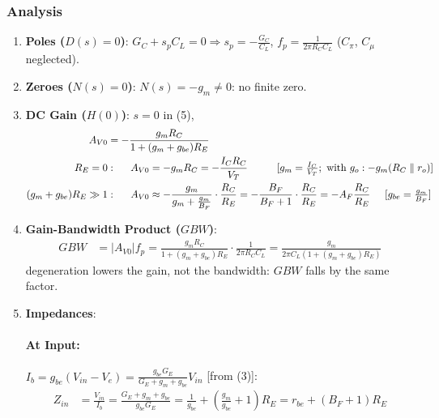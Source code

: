 \subsubsection{Analysis}
\begin{enumerate}
  \item \textbf{Poles (\(D(s) = 0\))}: \(G_C + s_p C_L = 0 \Rightarrow s_p = -\frac{G_C}{C_L}\),
    \(f_p = \frac{1}{2\pi R_C C_L}\) (\(C_\pi\), \(C_\mu\) neglected).
  \item \textbf{Zeroes (\(N(s) = 0\))}: \(N(s) = -g_m \neq 0\): no finite zero.
  \item \textbf{DC Gain (\(H(0)\))}: \(s = 0\) in (5),
    \begin{align*}
      A_{V0} &= -\frac{g_m R_C}{1 + (g_m + g_{be}) R_E} \\
      R_E = 0 &: \hspace{0.5cm} A_{V0} = -g_m R_C = -\frac{I_C R_C}{V_T} \hspace{1cm} [g_m = \tfrac{I_C}{V_T};\ \text{with } g_o: -g_m (R_C \parallel r_o)] \\
      (g_m + g_{be}) R_E \gg 1 &: \hspace{0.5cm} A_{V0} \approx -\frac{g_m}{g_m + \frac{g_m}{B_F}}\cdot\frac{R_C}{R_E} = -\frac{B_F}{B_F + 1}\cdot\frac{R_C}{R_E} = -A_F \frac{R_C}{R_E} \hspace{0.5cm} [g_{be} = \tfrac{g_m}{B_F}]
    \end{align*}
  \item \textbf{Gain-Bandwidth Product (\(GBW\))}:
    \begin{align*}
      GBW &= |A_{V0}| f_p = \frac{g_m R_C}{1 + (g_m + g_{be}) R_E}\cdot\frac{1}{2\pi R_C C_L} = \frac{g_m}{2\pi C_L\left(1 + (g_m + g_{be}) R_E\right)}
    \end{align*}
    degeneration lowers the gain, not the bandwidth: \(GBW\) falls by the same factor.
  \item \textbf{Impedances}:
    \paragraph{At Input:} \(I_b = g_{be}(V_{in} - V_e) = \frac{g_{be} G_E}{G_E + g_m + g_{be}} V_{in}\) [from (3)]:
    \begin{align*}
      Z_{in} &= \frac{V_{in}}{I_b} = \frac{G_E + g_m + g_{be}}{g_{be} G_E} = \frac{1}{g_{be}} + \left(\frac{g_m}{g_{be}} + 1\right) R_E = r_{be} + (B_F + 1) R_E
    \end{align*}

\end{enumerate}
